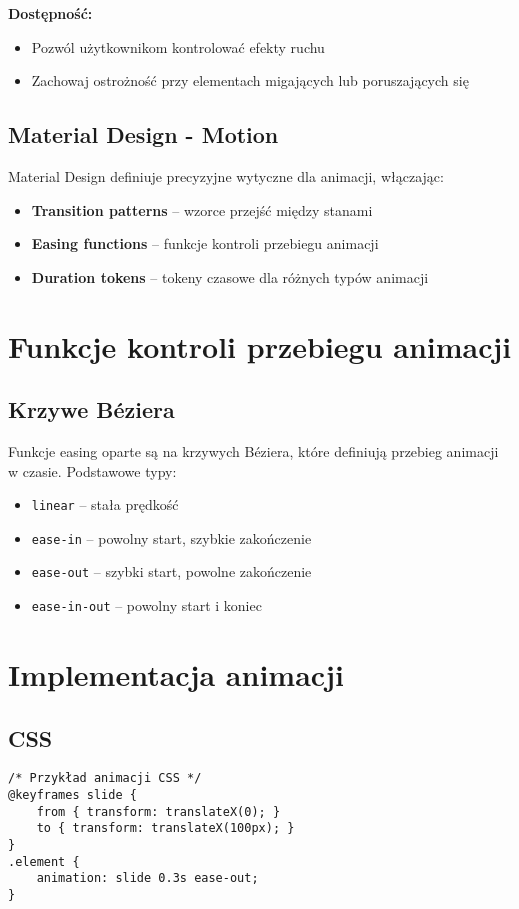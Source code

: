 \textbf{Dostępność:}
\begin{itemize}[itemsep=0pt]
    \item Pozwól użytkownikom kontrolować efekty ruchu
    \item Zachowaj ostrożność przy elementach migających lub poruszających się
\end{itemize}

\subsection{Material Design - Motion}
Material Design definiuje precyzyjne wytyczne dla animacji, włączając:
\begin{itemize}[itemsep=0pt]
    \item \textbf{Transition patterns} -- wzorce przejść między stanami
    \item \textbf{Easing functions} -- funkcje kontroli przebiegu animacji
    \item \textbf{Duration tokens} -- tokeny czasowe dla różnych typów animacji
\end{itemize}

\section{Funkcje kontroli przebiegu animacji}

\subsection{Krzywe Béziera}
Funkcje easing oparte są na krzywych Béziera, które definiują przebieg animacji w czasie. Podstawowe typy:
\begin{itemize}[itemsep=0pt]
    \item \texttt{linear} -- stała prędkość
    \item \texttt{ease-in} -- powolny start, szybkie zakończenie
    \item \texttt{ease-out} -- szybki start, powolne zakończenie
    \item \texttt{ease-in-out} -- powolny start i koniec
\end{itemize}

\section{Implementacja animacji}

\subsection{CSS}
\begin{verbatim}
/* Przykład animacji CSS */
@keyframes slide {
    from { transform: translateX(0); }
    to { transform: translateX(100px); }
}
.element {
    animation: slide 0.3s ease-out;
}
\end{verbatim}

